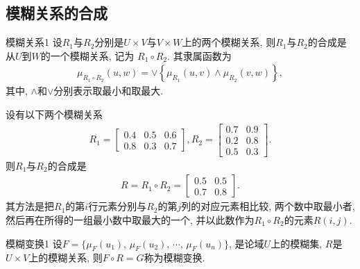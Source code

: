 \subsection{模糊关系的合成}
\begin{mydef}{模糊关系}{1}
    设$R_1$与$R_2$分别是$U\times V$与$V\times W$上的两个模糊关系, 则$R_1$与$R_2$的合成是从$U$到$W$的一个模糊关系, 记为   $R_1\circ R_2$. 其隶属函数为
\begin{align}
  \mu_{R_{1}\circ R_{2}}(u, w)=\vee\left\{\mu_{R_{1}}(u, v) \wedge \mu_{R_{2}}(v, w)\right\},
\end{align}
其中, $\wedge$和$\vee$分别表示取最小和取最大.
\end{mydef}

\begin{example}
设有以下两个模糊关系
\begin{align*}
    R_{1}=\left[\begin{array}{ccc}{0.4} & {0.5} & {0.6} \\
    {0.8} & {0.3} & {0.7}
    \end{array}\right],
    R_{2}=\left[\begin{array}{cc}{0.7} & {0.9} \\
    {0.2} & {0.8} \\
    {0.5} & {0.3}
    \end{array}\right].
\end{align*}
则$R_1$与$R_2$的合成是
\begin{align}
    R=R_{1} \circ R_{2}=\left[
    \begin{array}{ll}
    {0.5} & {0.5} \\
    {0.7} & {0.8}
    \end{array}\right].
\end{align}
其方法是把$R_1$的第$i$行元素分别与$R_2$的第$j$列的对应元素相比较, 两个数中取最小者, 然后再在所得的一组最小数中取最大的一个, 并以此数作为$R_1\circ R_2$的元素$R(i,j)$.
\end{example}
\begin{mydef}{模糊变换}{1}
    设$F=\{\mu_F(u_1),\,\mu_F(u_2),\,\cdots,\, \mu_F(u_n)\}$, 是论域$U$上的模糊集, $R$是$U\times V$上的模糊关系, 则$F\circ R=G$称为模糊变换.
\end{mydef}
